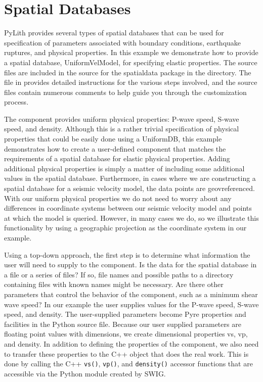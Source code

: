 \section{Spatial Databases}
\label{sec:extending:spatialdata:databases}

PyLith provides several types of spatial databases that can be used
for specification of parameters associated with boundary conditions,
earthquake ruptures, and physical properties. In this example we demonstrate
how to provide a spatial database, UniformVelModel, for specifying
elastic properties. The source files are included in the source for
the spatialdata package in the  directory.
The  file in  provides
detailed instructions for the various steps involved, and the source
files contain numerous comments to help guide you through the customization
process. 

The  component provides uniform physical
properties: P-wave speed, S-wave speed, and density. Although this is
a rather trivial specification of physical properties that could be
easily done using a UniformDB, this example demonstrates how to create
a user-defined component that matches the requirements of a spatial
database for elastic physical properties. Adding additional physical
properties is simply a matter of including some additional values in
the spatial database. Furthermore, in cases where we are constructing
a spatial database for a seismic velocity model, the data points are
geovreferenced. With our uniform physical properties we do not need to
worry about any differences in coordinate systems between our seismic
velocity model and points at which the model is queried. However, in
many cases we do, so we illustrate this functionality by using a
geographic projection as the coordinate system in our example.

Using a top-down approach, the first step is to determine what
information the user will need to supply to the component. Is the data
for the spatial database in a file or a series of files? If so, file
names and possible paths to a directory containing files with known
names might be necessary. Are there other parameters that control the
behavior of the component, such as a minimum shear wave speed? In our
example the user supplies values for the P-wave speed, S-wave speed,
and density.  The user-supplied parameters become Pyre properties and
facilities in the Python source file. Because our user supplied
parameters are floating point values with dimensions, we create
dimensional properties vs, vp, and density. In addition to defining the properties of the
component, we also need to transfer these properties to the C++ object
that does the real work. This is done by calling the C++
\texttt{vs()}, \texttt{vp()}, and \texttt{density()} accessor
functions that are accessible via the Python module created by SWIG.


